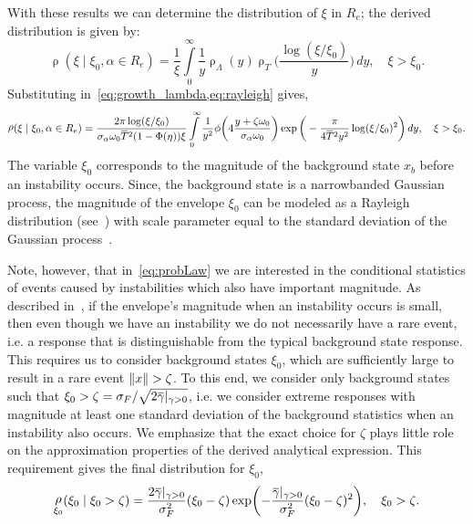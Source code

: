 \documentclass[3p]{elsarticle}
\newcommand{\overbar}[1]{\mkern 1mu\overline{\mkern-1mu#1\mkern-1mu}\mkern 1mu}
\DeclarePairedDelimiter\norm{\lVert}{\rVert}
\DeclareMathOperator{\pdf}{\rho}
\begin{document}
With these results we can determine the distribution of $\xi$ in $R_e$; the derived distribution is given by:
\begin{equation}\label{eq:density1}
    \pdf(\xi\mid  \xi_0, \alpha \in R_e)=\frac{1}{\xi}\int\limits_{0}^{\infty}\frac{1}{y}\pdf_{\Lambda}(y)\pdf_{T}\biggl(\frac{\log(\xi/\xi_0)}{y}\biggr)\, dy, \quad \xi>\xi_0.
\end{equation}
Substituting in~\cref{eq:growth_lambda,eq:rayleigh} gives,
\begin{equation}\label{eq:densitygrowth}
    \pdf(  \xi\mid  \xi_0, \alpha \in R_e) = \frac{2\pi \log(\xi/\xi_0)}{\sigma_{\alpha} \omega_0 \overbar T^2 (1-\Phi(\eta)) \xi} \int\limits_0^\infty \frac{1}{y^2}\phi\biggl(4\frac{y + \zeta \omega_0}{\sigma_{\alpha} \omega_0}\biggr)   \exp{\bigg(-\frac{\pi}{4 \overbar T^2 y^2 } \log(\xi/\xi_0)^2\bigg)}\,dy, \quad  \xi>\xi_0.
\end{equation}
The   variable $\xi_0$  corresponds to  the magnitude of the background state   $x_b$    before an instability occurs. Since, the background state is a narrowbanded Gaussian process, the magnitude of the envelope  $\xi_0$  can be modeled as a Rayleigh distribution (see~\cite{267314419860322}) with scale parameter equal to the standard deviation of the Gaussian process~. 

Note, however, that in~\cref{eq:probLaw} we are interested in the conditional statistics of events caused by instabilities which also have important magnitude. As described in~\cite{mohamad2015}, if the envelope's magnitude when an instability occurs is   small,  then even though we have an instability we do not necessarily  have a rare event, i.e. a response that is distinguishable from the typical background
 state response. This requires us to   consider background states   $\xi_0$, which are sufficiently large to result in a rare event $\norm{x}>\zeta$. To this end, we consider only background states such that $\xi_0>\zeta= \sigma_F / \sqrt{2 \overbar \gamma|_{\gamma>0}}$, i.e. we consider   extreme   responses with magnitude at least one standard deviation of the background statistics when an instability also occurs. We emphasize that the exact choice for $\zeta$ plays   little role on the approximation properties of the derived analytical expression.  This requirement gives the final distribution for $\xi_0$,
\begin{equation}\label{eq:modeenvelope_mat}
\pdf_{\xi_0}(\xi_0\mid \xi_0 > \zeta) =  \frac{2 \overbar\gamma|_{\gamma>0}}{\sigma_F^2} (\xi_0 - \zeta)  \exp\biggl(- \frac{  \overbar\gamma|_{\gamma>0}}{\sigma_F^2} (\xi_0-\zeta)^2\biggr), \quad \xi_0 > \zeta.
\end{equation}
\end{document}

